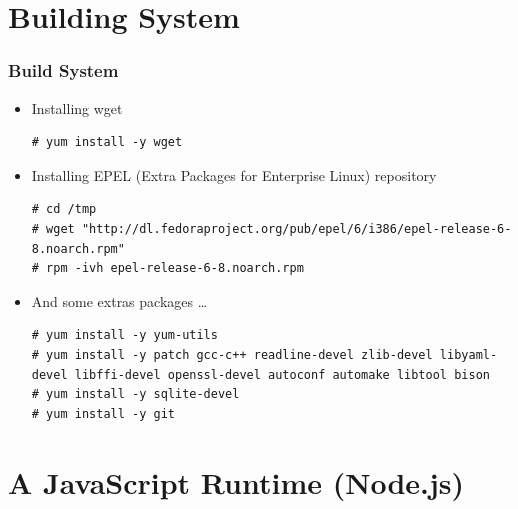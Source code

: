 \documentclass{beamer}
\begin{document}

\section{Building System}
\begin{frame}[fragile]
\frametitle{Build System}
\lstset{language=shell, escapechar=!}
\begin{itemize}
\item Installing wget
\begin{lstlisting}[escapechar=!]
# yum install -y wget
\end{lstlisting}

\item Installing EPEL (Extra Packages for Enterprise Linux) repository 
\begin{lstlisting}[escapechar=!]
# cd /tmp
# wget "http://dl.fedoraproject.org/pub/epel/6/i386/epel-release-6-8.noarch.rpm"
# rpm -ivh epel-release-6-8.noarch.rpm
\end{lstlisting}

\item And some extras packages \dots

\begin{lstlisting}[escapechar=!]
# yum install -y yum-utils
# yum install -y patch gcc-c++ readline-devel zlib-devel libyaml-devel libffi-devel openssl-devel autoconf automake libtool bison
# yum install -y sqlite-devel
# yum install -y git
\end{lstlisting}
\end{itemize}
\end{frame}
\section{A JavaScript Runtime (Node.js)}
\end{document}
